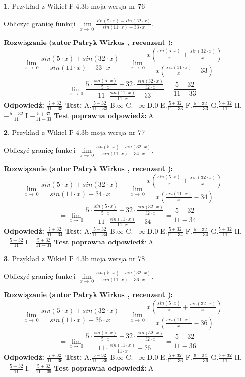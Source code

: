 \documentclass[12pt, a4paper]{article}
\theoremstyle{definition} %
\newtheorem{zad}{}
\newcommand{\zadStart}[1]{\begin{zad}#1\newline}
\newcommand{\zadStop}{\end{zad}}
\newcommand{\rozwStart}[2]{\noindent \textbf{Rozwiązanie (autor #1 , recenzent #2): }\newline}
\newcommand{\rozwStop}{\newline}
\newcommand{\odpStart}{\noindent \textbf{Odpowiedź:}\newline}
\newcommand{\odpStop}{\newline}
\newcommand{\testStart}{\noindent \textbf{Test:}\newline}
\newcommand{\testStop}{\newline}
\newcommand{\kluczStart}{\noindent \textbf{Test poprawna odpowiedź:}\newline}
\newcommand{\kluczStop}{\newline}
\begin{document}
\zadStart{Przykład z Wikieł P 4.3b moja wersja nr 76}


Obliczyć granicę funkcji $\lim\limits_{x\to\ 0}\frac{sin(5 \cdot x)+sin(32 \cdot x)}{sin(11 \cdot x)-33 \cdot x}$.
\zadStop
\rozwStart{Patryk Wirkus}{}
$$\lim\limits_{x\to\ 0}\frac{sin(5 \cdot x)+sin(32 \cdot x)}{sin(11 \cdot x)-33 \cdot x}=\lim\limits_{x\to\ 0}\frac{x(\frac{sin(5 \cdot x)}{x}+\frac{sin(32 \cdot x)}{x})}{x(\frac{sin(11 \cdot x)}{x}-33)}=$$
$$=\lim\limits_{x\to\ 0}\frac{5 \cdot \frac{sin(5 \cdot x)}{5 \cdot x}+32 \cdot \frac{sin(32 \cdot x)}{32 \cdot x}}{11 \cdot \frac{sin(11 \cdot x)}{11 \cdot x}-33}=\frac{5+32}{11-33}$$
\rozwStop
\odpStart
$\frac{5+32}{11-33}$
\odpStop
\testStart
A.$\frac{5+32}{11-33}$
B.$\infty$
C.$-\infty$
D.$0$
E.$\frac{5+32}{11+33}$
F.$\frac{5-32}{11-33}$
G.$\frac{5+32}{11}$
H.$-\frac{5+32}{11}$
I.$-\frac{5+32}{11-33}$
\testStop
\kluczStart
A
\kluczStop



\zadStart{Przykład z Wikieł P 4.3b moja wersja nr 77}


Obliczyć granicę funkcji $\lim\limits_{x\to\ 0}\frac{sin(5 \cdot x)+sin(32 \cdot x)}{sin(11 \cdot x)-34 \cdot x}$.
\zadStop
\rozwStart{Patryk Wirkus}{}
$$\lim\limits_{x\to\ 0}\frac{sin(5 \cdot x)+sin(32 \cdot x)}{sin(11 \cdot x)-34 \cdot x}=\lim\limits_{x\to\ 0}\frac{x(\frac{sin(5 \cdot x)}{x}+\frac{sin(32 \cdot x)}{x})}{x(\frac{sin(11 \cdot x)}{x}-34)}=$$
$$=\lim\limits_{x\to\ 0}\frac{5 \cdot \frac{sin(5 \cdot x)}{5 \cdot x}+32 \cdot \frac{sin(32 \cdot x)}{32 \cdot x}}{11 \cdot \frac{sin(11 \cdot x)}{11 \cdot x}-34}=\frac{5+32}{11-34}$$
\rozwStop
\odpStart
$\frac{5+32}{11-34}$
\odpStop
\testStart
A.$\frac{5+32}{11-34}$
B.$\infty$
C.$-\infty$
D.$0$
E.$\frac{5+32}{11+34}$
F.$\frac{5-32}{11-34}$
G.$\frac{5+32}{11}$
H.$-\frac{5+32}{11}$
I.$-\frac{5+32}{11-34}$
\testStop
\kluczStart
A
\kluczStop



\zadStart{Przykład z Wikieł P 4.3b moja wersja nr 78}


Obliczyć granicę funkcji $\lim\limits_{x\to\ 0}\frac{sin(5 \cdot x)+sin(32 \cdot x)}{sin(11 \cdot x)-36 \cdot x}$.
\zadStop
\rozwStart{Patryk Wirkus}{}
$$\lim\limits_{x\to\ 0}\frac{sin(5 \cdot x)+sin(32 \cdot x)}{sin(11 \cdot x)-36 \cdot x}=\lim\limits_{x\to\ 0}\frac{x(\frac{sin(5 \cdot x)}{x}+\frac{sin(32 \cdot x)}{x})}{x(\frac{sin(11 \cdot x)}{x}-36)}=$$
$$=\lim\limits_{x\to\ 0}\frac{5 \cdot \frac{sin(5 \cdot x)}{5 \cdot x}+32 \cdot \frac{sin(32 \cdot x)}{32 \cdot x}}{11 \cdot \frac{sin(11 \cdot x)}{11 \cdot x}-36}=\frac{5+32}{11-36}$$
\rozwStop
\odpStart
$\frac{5+32}{11-36}$
\odpStop
\testStart
A.$\frac{5+32}{11-36}$
B.$\infty$
C.$-\infty$
D.$0$
E.$\frac{5+32}{11+36}$
F.$\frac{5-32}{11-36}$
G.$\frac{5+32}{11}$
H.$-\frac{5+32}{11}$
I.$-\frac{5+32}{11-36}$
\testStop
\kluczStart
A
\kluczStop
\end{document}
